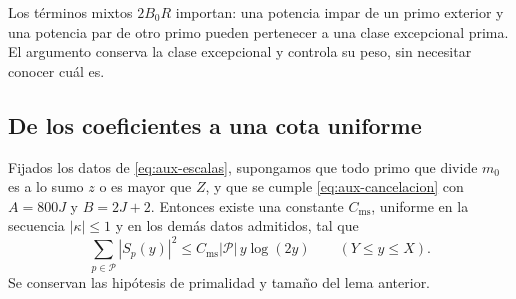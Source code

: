 Los términos mixtos $2B_0R$ importan: una potencia impar de un primo
exterior y una potencia par de otro primo pueden pertenecer a una clase
excepcional prima. El argumento conserva la clase excepcional y controla
su peso, sin necesitar conocer cuál es.

\subsection{De los coeficientes a una cota uniforme}

\begin{proposicion}
\label{prop:aux-momento}
Fijados los datos de \eqref{eq:aux-escalas}, supongamos que todo primo
que divide $m_0$ es a lo sumo $z$ o es mayor que $Z$, y que se cumple
\eqref{eq:aux-cancelacion} con $A=800J$ y $B=2J+2$.
Entonces existe una constante $C_{\mathrm{ms}}$, uniforme en la secuencia
$|\kappa|\le1$ y en los demás datos admitidos, tal que
\begin{equation}
 \sum_{p\in\mathcal P}|S_p(y)|^2
 \le C_{\mathrm{ms}}|\mathcal P|\,y\log(2y)
 \qquad(Y\le y\le X).
 \label{eq:aux-momento}
\end{equation}
Se conservan las hipótesis de primalidad y tamaño del lema anterior.
\end{proposicion}

